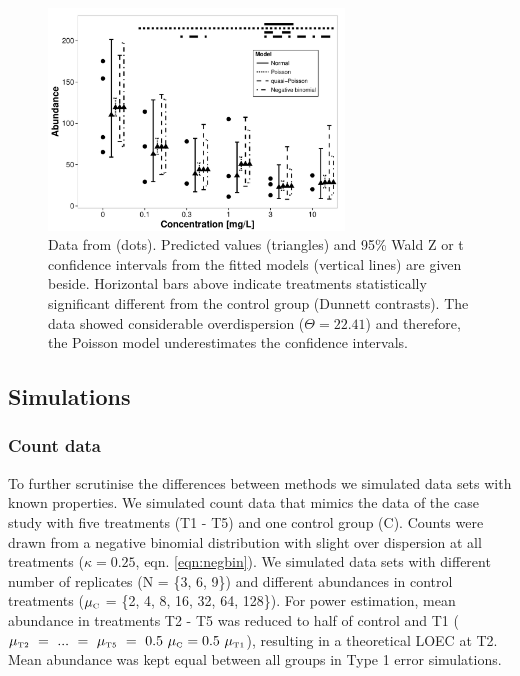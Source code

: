 \documentclass{scrartcl}
\begin{document}
\begin{figure}
  \centering
  \includegraphics[width = 0.7\textwidth]{example.pdf}
  \caption{Data from \citet{brock_minimum_2015} (dots). 
  Predicted values (triangles) and 95\% Wald Z or t confidence intervals from the fitted models (vertical lines) are given beside.
  Horizontal bars above indicate treatments statistically significant different from the control group (Dunnett contrasts).
  The data showed considerable overdispersion ($\Theta = 22.41$) and therefore, the Poisson model underestimates the confidence intervals.
  }
  \label{fig:example}
\end{figure}


\subsection{Simulations}
\subsubsection{Count data}
To further scrutinise the differences between methods we simulated data sets with known properties.
We simulated count data that mimics the data of the case study with five treatments (T1 - T5) and one control group (C).
Counts were drawn from a negative binomial distribution with slight over dispersion at all treatments ($\kappa = 0.25$, eqn. \ref{eqn:negbin}).
We simulated data sets with different number of replicates (N = \{3, 6, 9\}) and different abundances in control treatments ($\mu_\text{\tiny C}$ = \{2, 4, 8, 16, 32, 64, 128\}). 
For power estimation, mean abundance in treatments T2 - T5 was reduced to half of control and T1 ($\mu_\text{\tiny T2}~=~...~=~\mu_\text{\tiny T5}~=~0.5~\mu_\text{\tiny C} = 0.5~\mu_\text{\tiny T1}$), resulting in a theoretical LOEC at T2.
Mean abundance was kept equal between all groups in Type 1 error simulations.
\end{document}
